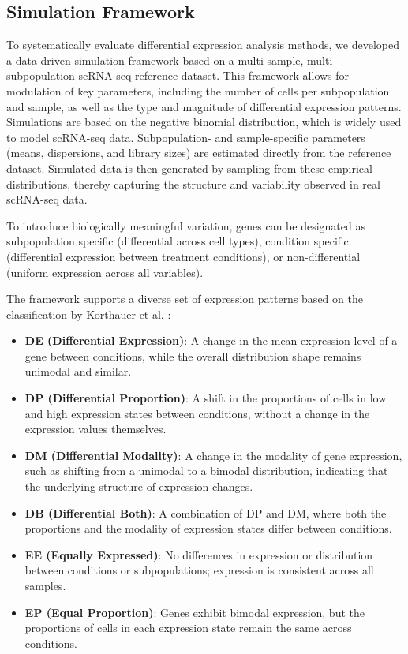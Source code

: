 \documentclass[a4paper, 11pt, twocolumn]{article}
\begin{document}
\begin{multicols}{2}
\subsection{Simulation Framework}

To systematically evaluate differential expression analysis methods, we developed a data-driven simulation framework based on a multi-sample, multi-subpopulation scRNA-seq reference dataset. This framework allows for modulation of key parameters, including the number of cells per subpopulation and sample, as well as the type and magnitude of differential expression patterns. Simulations are based on the negative binomial distribution, which is widely used to model scRNA-seq data. Subpopulation- and sample-specific parameters (means, dispersions, and library sizes) are estimated directly from the reference dataset. Simulated data is then generated by sampling from these empirical distributions, thereby capturing the structure and variability observed in real scRNA-seq data.

To introduce biologically meaningful variation, genes can be designated as subpopulation specific (differential across cell types), condition specific (differential expression between treatment conditions), or non-differential (uniform expression across all variables). 

The framework supports a diverse set of expression patterns based on the classification by Korthauer et al. \citep{korthauer2016statistical}:
\begin{itemize}[itemsep=1pt, topsep=1pt]
	\item \textbf{DE (Differential Expression)}: A change in the mean expression level of a gene between conditions, while the overall distribution shape remains unimodal and similar.
	\item \textbf{DP (Differential Proportion)}: A shift in the proportions of cells in low and high expression states between conditions, without a change in the expression values themselves.
	\item \textbf{DM (Differential Modality)}: A change in the modality of gene expression, such as shifting from a unimodal to a bimodal distribution, indicating that the underlying structure of expression changes.
	\item \textbf{DB (Differential Both)}: A combination of DP and DM, where both the proportions and the modality of expression states differ between conditions.
	\item \textbf{EE (Equally Expressed)}: No differences in expression or distribution between conditions or subpopulations; expression is consistent across all samples.
	\item \textbf{EP (Equal Proportion)}: Genes exhibit bimodal expression, but the proportions of cells in each expression state remain the same across conditions.
\end{itemize}


\end{multicols}
\end{document}
